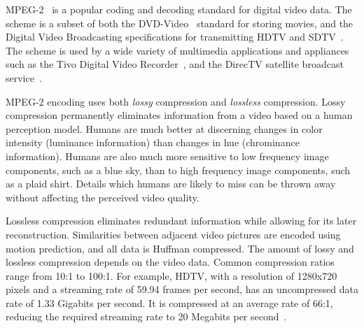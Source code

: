 
MPEG-2~\cite{MPEG2} is a popular coding and decoding standard
for digital video data. The scheme is a subset of both the
DVD-Video~\cite{Taylor:1999:SDV} standard for storing movies, and the Digital
Video Broadcasting specifications for transmitting HDTV and
SDTV~\cite{DVB}. The scheme is used by a wide variety of multimedia
applications and appliances such as the Tivo Digital Video
Recorder~\cite{tivo}, and the DirecTV satellite broadcast
service~\cite{directv}.

MPEG-2 encoding uses both {\it lossy} compression and {\it lossless}
compression. Lossy compression permanently eliminates information from
a video based on a human perception model. Humans are much better at
discerning changes in color intensity (luminance information) than
changes in hue (chrominance information). Humans are also much more
sensitive to low frequency image components, such as a blue sky, than
to high frequency image components, such as a plaid shirt. Details
which humans are likely to miss can be thrown away without affecting
the perceived video quality.

Lossless compression eliminates redundant information while allowing
for its later reconstruction. Similarities between adjacent video
pictures are encoded using motion prediction, and all data is Huffman
compressed\cite{Huffman52}. The amount of lossy and lossless
compression depends on the video data. Common compression ratios range
from 10:1 to 100:1. For example, HDTV, with a resolution of 1280x720
pixels and a streaming rate of 59.94 frames per second, has an
uncompressed data rate of 1.33 Gigabits per second. It is compressed at
an average rate of 66:1, reducing the required streaming rate to
20 Megabits per second~\cite{imagevidstandards}. %




